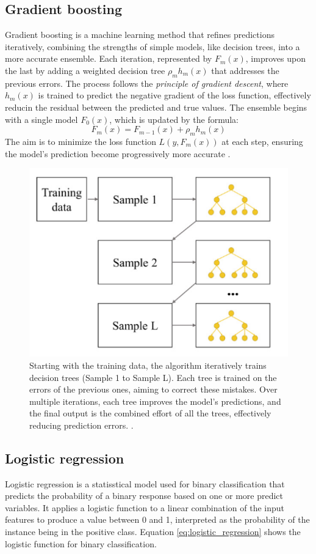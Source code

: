         \subsection{Gradient boosting}
            Gradient boosting is a machine learning method that refines predictions iteratively, combining the strengths of simple models, like decision trees, into a more accurate ensemble. Each iteration, represented by $F_m(x)$, improves upon the last by adding a weighted decision tree $\rho_m h_m(x)$ that addresses the previous errors. The process follows the \textit{principle of gradient descent}, where $h_m(x)$ is trained to predict the negative gradient of the loss function, effectively reducin the residual between the predicted and true values. The ensemble begins with a single model $F_0(x)$, which is updated by the formula:
            \begin{equation}
                F_m(x) = F_{m-1}(x) + \rho_m h_m(x)
            \end{equation}
            The aim is to minimize the loss function $L(y, F_m(x))$ at each step, ensuring the model's prediction become progressively more accurate \cite{bentejac_comparative_2021}.
            \begin{figure}[H]
                \centering
                \includegraphics[width=.5\textwidth]{../src/resources/boosting.png}
                \caption{
                    Starting with the training data, the algorithm iteratively trains decision trees (Sample 1 to Sample L). Each tree is trained on the errors of the previous ones, aiming to correct these mistakes. Over multiple iterations, each tree improves the model's predictions, and the final output is the combined effort of all the trees, effectively reducing prediction errors. \cite{cha_comparison_2021}.
                }
                \label{fig:gradient_boosting}
            \end{figure}

        \newpage

        \subsection{Logistic regression}
            Logistic regression is a statisstical model used for binary classification that predicts the probability of a binary response based on one or more predict variables. It applies a logistic function to a linear combination of the input features to produce a value between 0 and 1, interpreted as the probability of the instance being in the positive class.
            Equation \ref{eq:logistic_regression} shows the logistic function for binary classification.

